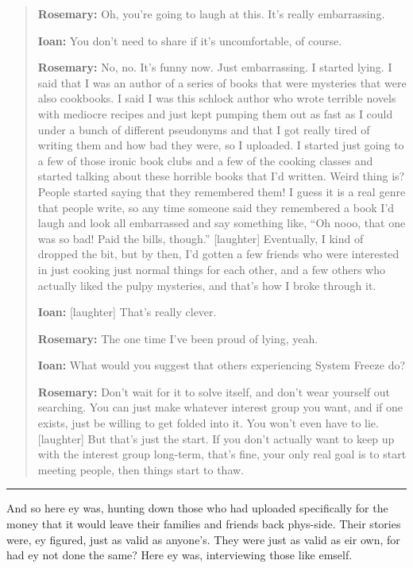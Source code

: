 \begin{quote}
\textbf{Rosemary:} Oh, you're going to laugh at this. It's really embarrassing.

\textbf{Ioan:} You don't need to share if it's uncomfortable, of course.

\textbf{Rosemary:} No, no. It's funny now. Just embarrassing. I started lying. I said that I was an author of a series of books that were mysteries that were also cookbooks. I said I was this schlock author who wrote terrible novels with mediocre recipes and just kept pumping them out as fast as I could under a bunch of different pseudonyms and that I got really tired of writing them and how bad they were, so I uploaded. I started just going to a few of those ironic book clubs and a few of the cooking classes and started talking about these horrible books that I'd written. Weird thing is? People started saying that they remembered them! I guess it is a real genre that people write, so any time someone said they remembered a book I'd laugh and look all embarrassed and say something like, ``Oh nooo, that one was so bad! Paid the bills, though.'' {[}laughter{]} Eventually, I kind of dropped the bit, but by then, I'd gotten a few friends who were interested in just cooking just normal things for each other, and a few others who actually liked the pulpy mysteries, and that's how I broke through it.

\textbf{Ioan:} {[}laughter{]} That's really clever.

\textbf{Rosemary:} The one time I've been proud of lying, yeah.

\textbf{Ioan:} What would you suggest that others experiencing System Freeze do?

\textbf{Rosemary:} Don't wait for it to solve itself, and don't wear yourself out searching. You can just make whatever interest group you want, and if one exists, just be willing to get folded into it. You won't even have to lie. {[}laughter{]} But that's just the start. If you don't actually want to keep up with the interest group long-term, that's fine, your only real goal is to start meeting people, then things start to thaw.
\end{quote}

\begin{center}\rule{0.5\linewidth}{0.5pt}\end{center}

\noindent And so here ey was, hunting down those who had uploaded specifically for the money that it would leave their families and friends back phys-side. Their stories were, ey figured, just as valid as anyone's. They were just as valid as eir own, for had ey not done the same? Here ey was, interviewing those like emself.

